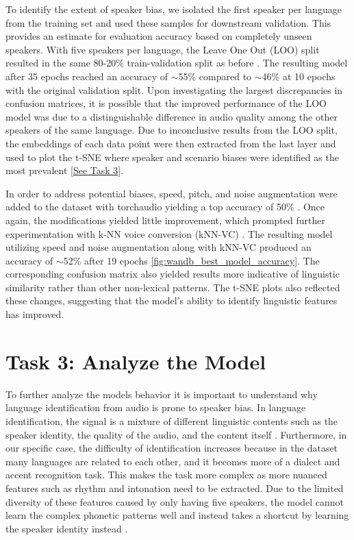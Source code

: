 \documentclass[11pt]{article}
\begin{document}
 To identify the extent of speaker bias, we isolated the first speaker per language from the training set and used these samples for downstream validation. This provides an estimate for evaluation accuracy based on completely unseen speakers. With five speakers per language, the Leave One Out (LOO) split resulted in the same 80-20\% train-validation split as before \citep{Code_hubert_loo_speaker}. The resulting model after 35 epochs reached an accuracy of $\sim$55\% compared to $\sim$46\% at 10 epochs with the original validation split. Upon investigating the largest discrepancies in confusion matrices, it is possible that the improved performance of the LOO model was due to a distinguishable difference in audio quality among the other speakers of the same language. Due to inconclusive results from the LOO split, the embeddings of each data point were then extracted from the last layer and used to plot the t-SNE where speaker and scenario biases were identified as the most prevalent [\hyperlink{task3_analysis}{See Task 3}].

 In order to address potential biases, speed, pitch, and noise augmentation were added to the dataset with torchaudio \citep{torchaudio_doc} yielding a top accuracy of 50\% \citep{Code_hubert_simple_aug}. Once again, the modifications yielded little improvement, which prompted further experimentation with k-NN voice conversion (kNN-VC) \citep{Code_hubert_knn_aug}. The resulting model utilizing speed and noise augmentation along with kNN-VC produced an accuracy of $\sim$52\% after 19 epochs \ref{fig:wandb_best_model_accuracy}. The corresponding confusion matrix also yielded results more indicative of linguistic similarity rather than other non-lexical patterns. The t-SNE plots also reflected these changes, suggesting that the model's ability to identify linguistic features has improved.

\section{Task 3: Analyze the Model} \label{task3_analysis}
 To further analyze the models behavior it is important to understand why language identification from audio is prone to speaker bias. In language identification, the signal is a mixture of different linguistic contents such as the speaker identity, the quality of the audio, and the content itself \citep{oshaughnessy2025lid}. Furthermore, in our specific case, the difficulty of identification increases because in the dataset many languages are related to each other, and it becomes more of a dialect and accent recognition task. This makes the task more complex as more nuanced features such as rhythm and intonation need to be extracted. Due to the limited diversity of these features caused by only having five speakers, the model cannot learn the complex phonetic patterns well and instead takes a shortcut by learning the speaker identity instead \citep{oshaughnessy2025lid}.
\end{document}
